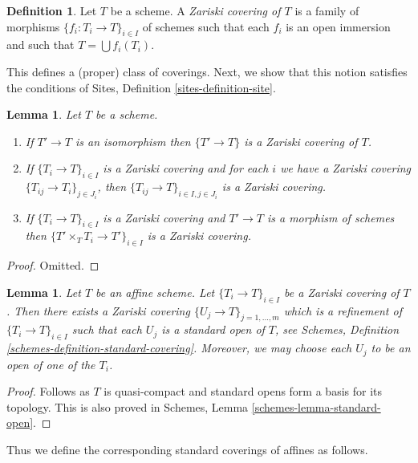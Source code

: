 \documentclass{stacks-project}
\theoremstyle{plain}
\newtheorem{lemma}[subsection]{Lemma}
\theoremstyle{definition}
\newtheorem{definition}[subsection]{Definition}
\theoremstyle{remark}
\numberwithin{equation}{subsection}
\begin{document}
\begin{definition}
\label{definition-zariski-covering}
Let $T$ be a scheme. A {\it Zariski covering of $T$} is a family
of morphisms $\{f_i : T_i \to T\}_{i \in I}$ of schemes
such that each $f_i$ is an open immersion and such
that $T = \bigcup f_i(T_i)$.
\end{definition}

\noindent
This defines a (proper) class of coverings.
Next, we show that this notion satisfies the conditions of
Sites, Definition \ref{sites-definition-site}.

\begin{lemma}
\label{lemma-zariski}
Let $T$ be a scheme.
\begin{enumerate}
\item If $T' \to T$ is an isomorphism then $\{T' \to T\}$
is a Zariski covering of $T$.
\item If $\{T_i \to T\}_{i\in I}$ is a Zariski covering and for each
$i$ we have a Zariski covering $\{T_{ij} \to T_i\}_{j\in J_i}$, then
$\{T_{ij} \to T\}_{i \in I, j\in J_i}$ is a Zariski covering.
\item If $\{T_i \to T\}_{i\in I}$ is a Zariski covering
and $T' \to T$ is a morphism of schemes then
$\{T' \times_T T_i \to T'\}_{i\in I}$ is a Zariski covering.
\end{enumerate}
\end{lemma}

\begin{proof}
Omitted.
\end{proof}

\begin{lemma}
\label{lemma-zariski-affine}
Let $T$ be an affine scheme. Let $\{T_i \to T\}_{i \in I}$ be a
Zariski covering of $T$. Then there exists a Zariski covering
$\{U_j \to T\}_{j = 1, \ldots, m}$ which is a refinement
of $\{T_i \to T\}_{i \in I}$ such that each $U_j$ is a standard
open of $T$, see
Schemes, Definition \ref{schemes-definition-standard-covering}.
Moreover, we may choose each $U_j$ to be an open of one of the $T_i$.
\end{lemma}

\begin{proof}
Follows as $T$ is quasi-compact and standard opens form a basis
for its topology. This is also proved in
Schemes, Lemma \ref{schemes-lemma-standard-open}.
\end{proof}

\noindent
Thus we define the corresponding standard coverings of affines as follows.
\end{document}
